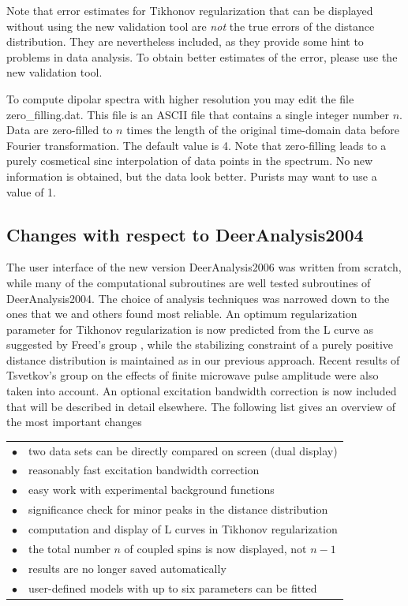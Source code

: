 \documentclass{article}
\begin{document}
\vspace{10pt}

Note that error estimates for Tikhonov regularization that can be displayed without using the new validation tool are \emph{not} the true errors of the distance distribution. They are nevertheless included, as they provide some hint to problems in data analysis. To obtain better estimates of the error, please use the new validation tool.

To compute dipolar spectra with higher resolution you may edit the file {\ttfamily zero\_filling.dat}. This file is an ASCII file that contains a single integer number $n$. Data are zero-filled to $n$ times the length of the original time-domain data before Fourier transformation. The default value is 4. Note that zero-filling leads to a purely cosmetical sinc interpolation of data points in the spectrum. No new information is obtained, but the data look better. Purists may want to use a value of 1.

\subsection{Changes with respect to DeerAnalysis2004}
\label{changes}

The user interface of the new version DeerAnalysis2006 was written from scratch, while many of the computational subroutines are well tested subroutines of DeerAnalysis2004. The choice of analysis techniques was narrowed down to the ones that we and others found most reliable. An optimum regularization parameter for Tikhonov regularization is now predicted from the L curve as suggested by Freed's group \cite{freed2005}, while the stabilizing constraint of a purely positive distance distribution is maintained as in our previous approach. Recent results of Tsvetkov's group on the effects of finite microwave pulse amplitude \cite{maryasov2000,milov2004} were also taken into account. An optional excitation bandwidth correction is now included that will be described in detail elsewhere. The following list gives an overview of the most important changes    

\begin{tabular}{ll}
\noalign{\smallskip}
$\bullet$ & two data sets can be directly compared on screen (dual display) \\
$\bullet$ & reasonably fast excitation bandwidth correction\\
$\bullet$ & easy work with experimental background functions\\
$\bullet$ & significance check for minor peaks in the distance distribution\\
$\bullet$ & computation and display of L curves in Tikhonov regularization\\
$\bullet$ & the total number $n$ of coupled spins is now displayed, not $n-1$\\
$\bullet$ & results are no longer saved automatically\\
$\bullet$ & user-defined models with up to six parameters can be fitted\\
\end{tabular}
\end{document}
